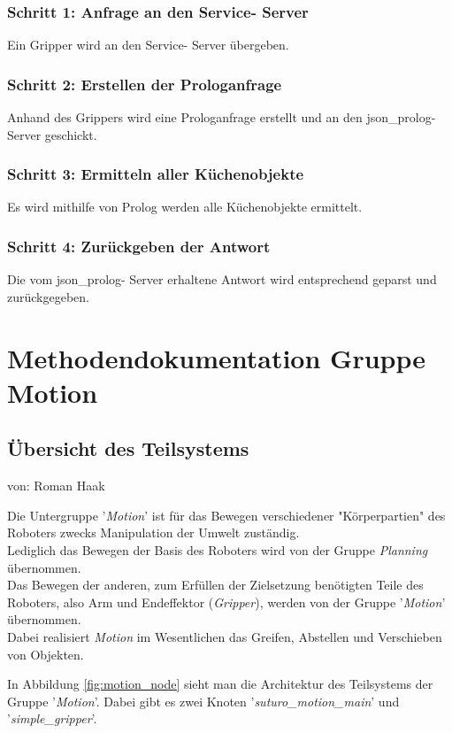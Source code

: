 \documentclass{suturo}
\makeatletter
\newcommand{\chapterauthor}[1]{%
  {\parindent0pt\vspace*{-27pt}%
  \linespread{0}\small\begin{flushright}von: #1\end{flushright}%
  \par\nobreak\vspace*{0pt}}
  \@afterheading%
}
\makeatother
\begin{document}
\subsubsection{Schritt 1: Anfrage an den Service- Server}
Ein Gripper wird an den Service- Server übergeben.
\subsubsection{Schritt 2: Erstellen der Prologanfrage}
Anhand des Grippers wird eine Prologanfrage erstellt und an den json\_prolog- Server geschickt.
\subsubsection{Schritt 3: Ermitteln aller Küchenobjekte} 
Es wird mithilfe von Prolog werden alle Küchenobjekte ermittelt.
\subsubsection{Schritt 4: Zurückgeben der Antwort}
Die vom json\_prolog- Server erhaltene Antwort wird entsprechend geparst und zurückgegeben.



\newpage

\section{Methodendokumentation Gruppe Motion}

\subsection{Übersicht des Teilsystems}
\chapterauthor{Roman Haak}
Die Untergruppe '\textit{Motion}' ist für das Bewegen verschiedener "Körperpartien" des Roboters zwecks Manipulation der Umwelt zuständig.\\
Lediglich das Bewegen der Basis des Roboters wird von der Gruppe \textit{Planning} übernommen.\\
Das Bewegen der anderen, zum Erfüllen der Zielsetzung benötigten Teile des Roboters, also Arm und Endeffektor (\textit{Gripper}), werden 
von der Gruppe '\textit{Motion}' übernommen.\\
Dabei realisiert \textit{Motion} im Wesentlichen das Greifen, Abstellen und Verschieben von Objekten.

In Abbildung \ref{fig:motion_node} sieht man die Architektur des Teilsystems der Gruppe '\textit{Motion}'. Dabei gibt es zwei Knoten '\textit{suturo\_motion\_main}' und '\textit{simple\_gripper}'.\\
\end{document}
